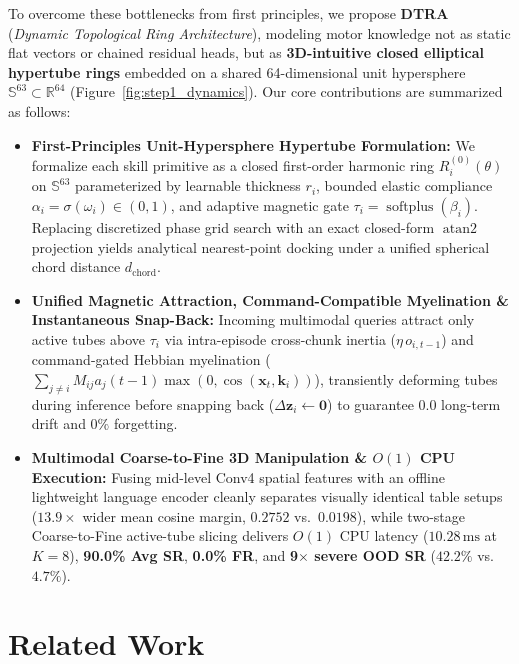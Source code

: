 \documentclass[10pt,twocolumn]{article}
\begin{document}
To overcome these bottlenecks from first principles, we propose \textbf{DTRA} (\emph{Dynamic Topological Ring Architecture}), modeling motor knowledge not as static flat vectors or chained residual heads, but as \textbf{3D-intuitive closed elliptical hypertube rings} embedded on a shared 64-dimensional unit hypersphere $\mathbb{S}^{63} \subset \mathbb{R}^{64}$ (Figure~\ref{fig:step1_dynamics}). Our core contributions are summarized as follows:
\begin{itemize}[leftmargin=*,itemsep=2pt]
  \item \textbf{First-Principles Unit-Hypersphere Hypertube Formulation:} We formalize each skill primitive as a closed first-order harmonic ring $R_i^{(0)}(\theta)$ on $\mathbb{S}^{63}$ parameterized by learnable thickness $r_i$, bounded elastic compliance $\alpha_i = \sigma(\omega_i) \in (0,1)$, and adaptive magnetic gate $\tau_i = \operatorname{softplus}(\beta_i)$. Replacing discretized phase grid search with an exact closed-form $\operatorname{atan2}$ projection yields analytical nearest-point docking under a unified spherical chord distance $d_{\text{chord}}$.
  \item \textbf{Unified Magnetic Attraction, Command-Compatible Myelination \& Instantaneous Snap-Back:} Incoming multimodal queries attract only active tubes above $\tau_i$ via intra-episode cross-chunk inertia ($\eta\, o_{i,t-1}$) and command-gated Hebbian myelination ($\sum_{j \neq i} M_{ij} a_j(t-1)\max(0,\cos(\mathbf{x}_t, \mathbf{k}_i))$), transiently deforming tubes during inference before snapping back ($\Delta\mathbf{z}_i \leftarrow \mathbf{0}$) to guarantee $0.0$ long-term drift and $0\%$ forgetting.
  \item \textbf{Multimodal Coarse-to-Fine 3D Manipulation \& $O(1)$ CPU Execution:} Fusing mid-level Conv4 spatial features with an offline lightweight language encoder cleanly separates visually identical table setups ($13.9\times$ wider mean cosine margin, $0.2752$ vs.\ $0.0198$), while two-stage Coarse-to-Fine active-tube slicing delivers $O(1)$ CPU latency ($10.28\,\text{ms}$ at $K=8$), \textbf{90.0\% Avg SR}, \textbf{0.0\% FR}, and \textbf{9$\times$ severe OOD SR} ($42.2\%$ vs.\ $4.7\%$).
\end{itemize}

\section{Related Work}
\end{document}
